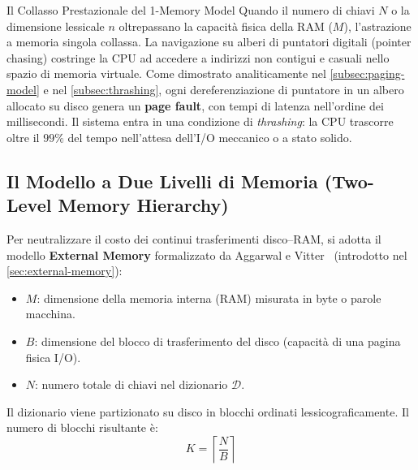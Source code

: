 \begin{alertblock}{Il Collasso Prestazionale del 1-Memory Model}
Quando il numero di chiavi $N$ o la dimensione lessicale $n$ oltrepassano la capacit\`a fisica della RAM ($M$), l'astrazione a memoria singola collassa. La navigazione su alberi di puntatori digitali (pointer chasing) costringe la CPU ad accedere a indirizzi non contigui e casuali nello spazio di memoria virtuale.
Come dimostrato analiticamente nel \autoref{subsec:paging-model} e nel \autoref{subsec:thrashing}, ogni dereferenziazione di puntatore in un albero allocato su disco genera un \textbf{page fault}, con tempi di latenza nell'ordine dei millisecondi. Il sistema entra in una condizione di \textit{thrashing}: la CPU trascorre oltre il $99\%$ del tempo nell'attesa dell'I/O meccanico o a stato solido.
\end{alertblock}

\FloatBarrier
\subsection{Il Modello a Due Livelli di Memoria (Two-Level Memory Hierarchy)}
\label{subsec:two-level-memory-hierarchy}

Per neutralizzare il costo dei continui trasferimenti disco--RAM, si adotta il modello \textbf{External Memory} formalizzato da Aggarwal e Vitter~\cite{aggarwal1988} (introdotto nel \autoref{sec:external-memory}):
\begin{itemize}
  \item $M$: dimensione della memoria interna (RAM) misurata in byte o parole macchina.
  \item $B$: dimensione del blocco di trasferimento del disco (capacit\`a di una pagina fisica I/O).
  \item $N$: numero totale di chiavi nel dizionario $\mathcal{D}$.
\end{itemize}

Il dizionario viene partizionato su disco in blocchi ordinati lessicograficamente. Il numero di blocchi risultante \`e:
\begin{equation}
  K = \left\lceil \frac{N}{B} \right\rceil
\end{equation}

